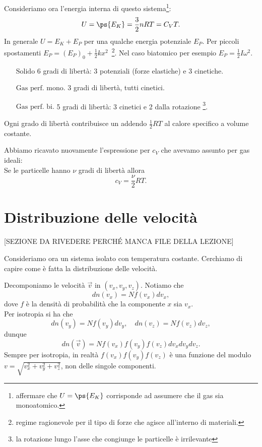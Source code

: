 \noindent
Consideriamo ora l'energia interna di questo sistema\footnote{affermare che $U=\ps{E_K}$ corrisponde ad assumere che il gas sia monoatomico.}:
\[U=\ps{E_K}=\frac32nRT=C_VT.\]
In generale $U=E_K+E_P$ per una qualche energia potenziale $E_P$. Per piccoli spostamenti $E_P=(E_P)_0+\frac12kx^2$\ \footnote{regime ragionevole per il tipo di forze che agisce all'interno di materiali.}. Nel caso biatomico per esempio $E_P=\frac12I\omega^2$.
\setlength{\leftmargini}{0cm}
\begin{itemize}
\item[$\boxed{\text{Solido}}$] 6 gradi di libert\`a: 3 potenziali (forze elastiche) e 3 cinetiche.
\item[$\boxed{\text{Gas perf. mono.}}$] 3 gradi di libert\`a, tutti cinetici.
\item[$\boxed{\text{Gas perf. bi.}}$] 5 gradi di libert\`a: 3 cinetici e 2 dalla rotazione \footnote{la rotazione lungo l'asse che congiunge le particelle \`e irrilevante}.
\end{itemize}
\setlength{\leftmargini}{0.5cm}


\begin{fact}
Ogni grado di libert\`a contribuisce un addendo $\frac12 RT$ al calore specifico a volume costante.
\end{fact}

\begin{remark}
Abbiamo ricavato nuovamente l'espressione per $c_V$ che avevamo assunto per gas ideali:\\
Se le particelle hanno $\nu$ gradi di libert\`a allora
\[c_V=\frac\nu2RT.\]
\end{remark}

\section{Distribuzione delle velocit\`a}
[SEZIONE DA RIVEDERE PERCH\'E MANCA FILE DELLA LEZIONE]


Consideriamo ora un sistema isolato con temperatura costante. Cerchiamo di capire come \`e fatta la distribuzione delle velocit\`a.

Decomponiamo le velocit\`a $\vec v$ in $(v_x,v_y,v_z)$. Notiamo che
\[dn(v_x)=Nf(v_x)dv_x,\]
dove $f$ \`e la densit\`a di probabilit\`a che la componente $x$ sia $v_x$.\\
Per isotropia si ha che
\[dn(v_y)=Nf(v_y)dv_y,\quad dn(v_z)=Nf(v_z)dv_z,\]
dunque
\[dn(\vec v)=N f(v_x)f(v_y)f(v_z)dv_xdv_ydv_z.\]
Sempre per isotropia, in realt\`a $f(v_x)f(v_y)f(v_z)$ \`e una funzione del modulo $v=\sqrt{v_x^2+v_y^2+v_z^2}$, non delle singole componenti.

